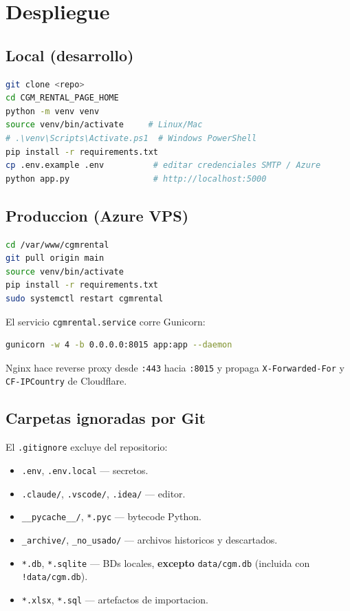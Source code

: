 \documentclass[11pt,a4paper]{article}
\begin{document}
\section{Despliegue}

\subsection{Local (desarrollo)}

\begin{lstlisting}[language=bash]
git clone <repo>
cd CGM_RENTAL_PAGE_HOME
python -m venv venv
source venv/bin/activate     # Linux/Mac
# .\venv\Scripts\Activate.ps1  # Windows PowerShell
pip install -r requirements.txt
cp .env.example .env          # editar credenciales SMTP / Azure
python app.py                 # http://localhost:5000
\end{lstlisting}

\subsection{Produccion (Azure VPS)}

\begin{lstlisting}[language=bash]
cd /var/www/cgmrental
git pull origin main
source venv/bin/activate
pip install -r requirements.txt
sudo systemctl restart cgmrental
\end{lstlisting}

El servicio \texttt{cgmrental.service} corre Gunicorn:

\begin{lstlisting}[language=bash]
gunicorn -w 4 -b 0.0.0.0:8015 app:app --daemon
\end{lstlisting}

Nginx hace reverse proxy desde \texttt{:443} hacia \texttt{:8015} y propaga
\texttt{X-Forwarded-For} y \texttt{CF-IPCountry} de Cloudflare.

\subsection{Carpetas ignoradas por Git}

El \texttt{.gitignore} excluye del repositorio:

\begin{itemize}[leftmargin=*]
    \item \texttt{.env}, \texttt{.env.local} --- secretos.
    \item \texttt{.claude/}, \texttt{.vscode/}, \texttt{.idea/} --- editor.
    \item \texttt{\_\_pycache\_\_/}, \texttt{*.pyc} --- bytecode Python.
    \item \texttt{\_archive/}, \texttt{\_no\_usado/} --- archivos historicos
        y descartados.
    \item \texttt{*.db}, \texttt{*.sqlite} --- BDs locales, \textbf{excepto}
        \texttt{data/cgm.db} (incluida con \texttt{!data/cgm.db}).
    \item \texttt{*.xlsx}, \texttt{*.sql} --- artefactos de importacion.
\end{itemize}
\end{document}
